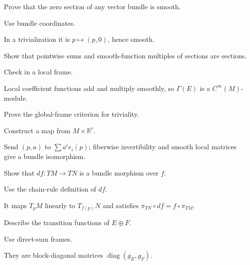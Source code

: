\begin{exercise}\label{exr:vii07-10}
Prove that the zero section of any vector bundle is smooth.
\end{exercise}
\begin{hint}
Use bundle coordinates.
\end{hint}
\begin{solution}
In a trivialization it is \(p\mapsto(p,0)\), hence smooth.
\end{solution}

\begin{exercise}\label{exr:vii07-11}
Show that pointwise sums and smooth-function multiples of sections are sections.
\end{exercise}
\begin{hint}
Check in a local frame.
\end{hint}
\begin{solution}
Local coefficient functions add and multiply smoothly, so \(\Gamma(E)\) is a \(C^\infty(M)\)-module.
\end{solution}

\begin{exercise}\label{exr:vii07-12}
Prove the global-frame criterion for triviality.
\end{exercise}
\begin{hint}
Construct a map from \(M\times\mathbb R^r\).
\end{hint}
\begin{solution}
Send \((p,a)\) to \(\sum a^ie_i(p)\); fiberwise invertibility and smooth local matrices give a bundle isomorphism.
\end{solution}

\begin{exercise}\label{exr:vii07-13}
Show that \(df:TM\to TN\) is a bundle morphism over \(f\).
\end{exercise}
\begin{hint}
Use the chain-rule definition of \(df\).
\end{hint}
\begin{solution}
It maps \(T_pM\) linearly to \(T_{f(p)}N\) and satisfies \(\pi_{TN}\circ df=f\circ\pi_{TM}\).
\end{solution}

\begin{exercise}\label{exr:vii07-14}
Describe the transition functions of \(E\oplus F\).
\end{exercise}
\begin{hint}
Use direct-sum frames.
\end{hint}
\begin{solution}
They are block-diagonal matrices \(\operatorname{diag}(g_E,g_F)\).
\end{solution}

